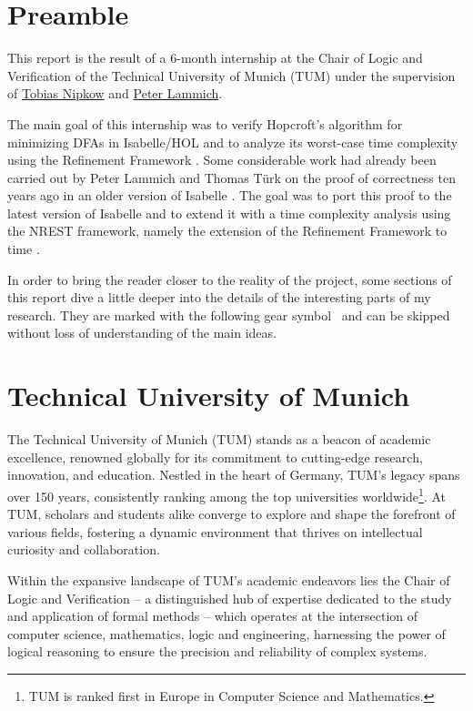 \documentclass[12pt, a4 paper]{article}
\theoremstyle{definition}
\begin{document}
\section{Preamble}

This report is the result of a 6-month internship at the Chair of Logic and Verification of the Technical University of Munich (TUM) under the supervision of \href{https://www21.in.tum.de/~nipkow/}{Tobias Nipkow} and \href{https://people.utwente.nl/p.lammich}{Peter Lammich}.

The main goal of this internship was to verify Hopcroft's algorithm for minimizing DFAs \cite{Hop71} in Isabelle/HOL and to analyze its worst-case time complexity using the Refinement Framework \cite{lammich:ref}.
Some considerable work had already been carried out by Peter Lammich and Thomas T\"urk on the proof of correctness ten years ago in an older version of Isabelle \cite{lammich:hop}.
The goal was to port this proof to the latest version of Isabelle and to extend it with a time complexity analysis using the NREST framework, namely the extension of the Refinement Framework to time \cite{refwithtime}.

In order to bring the reader closer to the reality of the project, some sections of this report dive a little deeper into the details of the interesting parts of my research. They are marked with the following gear symbol \faGears\ and can be skipped without loss of understanding of the main ideas.

\pagebreak

\section{Technical University of Munich}

The Technical University of Munich (TUM) stands as a beacon of academic excellence, renowned globally for its commitment to cutting-edge research, innovation, and education. Nestled in the heart of Germany, TUM's legacy spans over 150 years, consistently ranking among the top universities worldwide\footnote{TUM is ranked first in Europe in Computer Science and Mathematics. }. At TUM, scholars and students alike converge to explore and shape the forefront of various fields, fostering a dynamic environment that thrives on intellectual curiosity and collaboration.

Within the expansive landscape of TUM's academic endeavors lies the Chair of Logic and Verification -- a distinguished hub of expertise dedicated to the study and application of formal methods -- which operates at the intersection of computer science, mathematics, logic and engineering, harnessing the power of logical reasoning to ensure the precision and reliability of complex systems.
\end{document}

